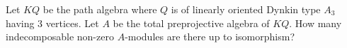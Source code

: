 Let $KQ$ be the path algebra where $Q$ is of linearly oriented Dynkin type $A_3$ having 3 vertices. Let $A$ be the total preprojective algebra of $KQ$. How many indecomposable non-zero $A$-modules are there up to isomorphism?
